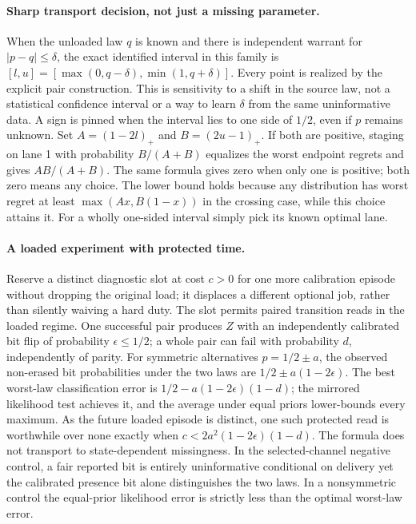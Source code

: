 \documentclass{article}
\begin{document}
\paragraph{Sharp transport decision, not just a missing parameter.}
When the unloaded law $q$ is known and there is independent warrant
for $|p-q|\le\delta$, the exact identified interval in this family is
$[l,u]=[\max(0,q-\delta),\min(1,q+\delta)]$. Every point is realized
by the explicit pair construction. This is sensitivity to a shift in
the source law, not a statistical confidence interval or a way to learn
$\delta$ from the same uninformative data. A sign is pinned when the
interval lies to one side of $1/2$, even if $p$ remains unknown.
Set $A=(1-2l)_+$ and $B=(2u-1)_+$. If both are positive, staging
on lane 1 with probability $B/(A+B)$ equalizes the worst endpoint
regrets and gives $AB/(A+B)$. The same formula gives zero when only
one is positive; both zero means any choice. The lower bound holds
because any distribution has worst regret at least
$\max(Ax,B(1-x))$ in the crossing case, while this choice attains it.
For a wholly one-sided interval simply pick its known optimal lane.

\paragraph{A loaded experiment with protected time.}
Reserve a distinct diagnostic slot at cost $c>0$ for one more
calibration episode without dropping the original load; it displaces
a different optional job, rather than silently waiving a hard duty.
The slot permits paired transition reads in the loaded regime.
One successful pair produces $Z$ with an independently calibrated
bit flip of probability $\epsilon\le1/2$; a whole pair can fail with
probability $d$, independently of parity. For symmetric alternatives
$p=1/2\pm a$, the observed non-erased bit probabilities under the two
laws are $1/2\pm a(1-2\epsilon)$. The best worst-law classification
error is $1/2-a(1-2\epsilon)(1-d)$; the mirrored likelihood test
achieves it, and the average under equal priors lower-bounds every
maximum. As the future loaded episode is distinct, one such protected
read is worthwhile over none exactly when
$c<2a^2(1-2\epsilon)(1-d)$. The formula does not transport to
state-dependent missingness. In the selected-channel negative control,
a fair reported bit is entirely uninformative conditional on delivery
yet the calibrated presence bit alone distinguishes the two laws.
In a nonsymmetric control the equal-prior likelihood error is strictly
less than the optimal worst-law error.
\end{document}
